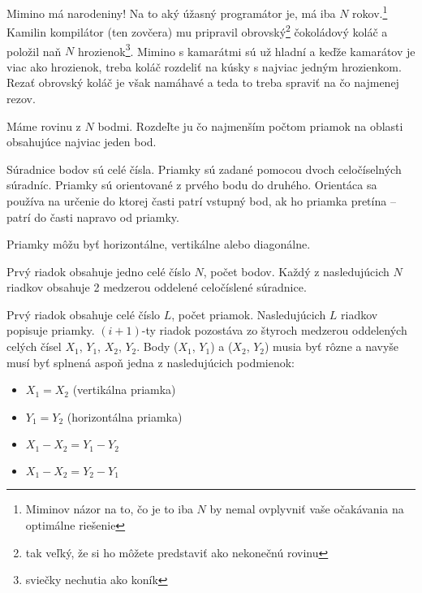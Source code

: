





Mimino má narodeniny!
Na to aký úžasný programátor je, má iba $N$
rokov.\footnote{Miminov názor na to, čo je to iba $N$
by nemal ovplyvniť vaše očakávania na optimálne riešenie}
Kamilin kompilátor (ten zovčera) mu pripravil obrovský\footnote{tak veľký, že si ho môžete predstaviť ako nekonečnú rovinu}
čokoládový koláč a položil naň $N$ hrozienok\footnote{sviečky nechutia ako koník}.
Mimino s kamarátmi sú už hladní a keďže kamarátov je viac ako hrozienok,
treba koláč rozdeliť na kúsky s najviac jedným hrozienkom.
Rezať obrovský koláč je však namáhavé a teda to treba spraviť
na čo najmenej rezov.


Máme rovinu z $N$ bodmi. Rozdeľte ju čo najmenším počtom priamok na oblasti obsahujúce najviac jeden bod.

Súradnice bodov sú celé čísla. Priamky sú zadané pomocou dvoch celočíselných súradníc.
Priamky sú orientované z prvého bodu do druhého.
Orientáca sa používa na určenie do ktorej časti patrí
vstupný bod, ak ho priamka pretína --
patrí do časti napravo od priamky.

Priamky môžu byť horizontálne, vertikálne alebo diagonálne.


Prvý riadok obsahuje jedno celé číslo $N$,
počet bodov.
Každý z nasledujúcich $N$ riadkov obsahuje
2 medzerou oddelené celočíslené súradnice.


Prvý riadok obsahuje celé číslo $L$, počet priamok.
Nasledujúcich $L$ riadkov popisuje priamky.
$(i+1)$-ty riadok pozostáva zo štyroch medzerou
oddelených celých čísel $X_1$, $Y_1$, $X_2$, $Y_2$.
Body ($X_1$, $Y_1$) a ($X_2$, $Y_2$) musia byť rôzne a
navyše musí byť splnená aspoň jedna z nasledujúcich podmienok:

\begin{itemize}
  \item $X_1 = X_2$ (vertikálna priamka)
  \item $Y_1 = Y_2$ (horizontálna priamka)
  \item $X_1 - X_2 = Y_1 - Y_2$
  \item $X_1 - X_2 = Y_2 - Y_1$
\end{itemize}

